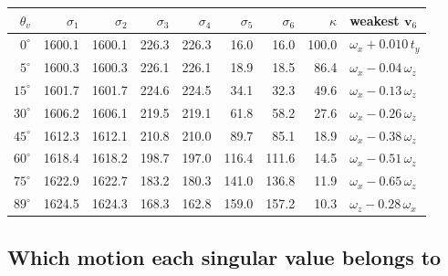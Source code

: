 \documentclass[11pt,a4paper]{article}
\theoremstyle{remark}
\newcommand{\vvec}{\mathbf{v}}
\begin{document}
\begin{center}
\small
\begin{tabular}{@{}rrrrrrrrl@{}}
\toprule
$\theta_v$ & $\sigma_1$ & $\sigma_2$ & $\sigma_3$ & $\sigma_4$ & $\sigma_5$
  & $\sigma_6$ & $\kappa$ & weakest $\vvec_6$ \\
\midrule
$0^{\circ}$  & 1600.1 & 1600.1 & 226.3 & 226.3 & 16.0  & 16.0  & 100.0
  & $\omega_x + 0.010\,t_y$ \\
$5^{\circ}$  & 1600.3 & 1600.3 & 226.1 & 226.1 & 18.9  & 18.5  & 86.4
  & $\omega_x - 0.04\,\omega_z$ \\
$15^{\circ}$ & 1601.7 & 1601.7 & 224.6 & 224.5 & 34.1  & 32.3  & 49.6
  & $\omega_x - 0.13\,\omega_z$ \\
$30^{\circ}$ & 1606.2 & 1606.1 & 219.5 & 219.1 & 61.8  & 58.2  & 27.6
  & $\omega_x - 0.26\,\omega_z$ \\
$45^{\circ}$ & 1612.3 & 1612.1 & 210.8 & 210.0 & 89.7  & 85.1  & 18.9
  & $\omega_x - 0.38\,\omega_z$ \\
$60^{\circ}$ & 1618.4 & 1618.2 & 198.7 & 197.0 & 116.4 & 111.6 & 14.5
  & $\omega_x - 0.51\,\omega_z$ \\
$75^{\circ}$ & 1622.9 & 1622.7 & 183.2 & 180.3 & 141.0 & 136.8 & 11.9
  & $\omega_x - 0.65\,\omega_z$ \\
$89^{\circ}$ & 1624.5 & 1624.3 & 168.3 & 162.8 & 159.0 & 157.2 & 10.3
  & $\omega_z - 0.28\,\omega_x$ \\
\bottomrule
\end{tabular}
\end{center}

\subsection{Which motion each singular value belongs to}
\label{sec:pairs}
\end{document}
